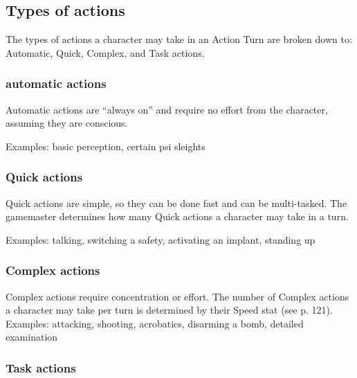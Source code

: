 \subsection{Types of actions} \label{sec:types-actions} 

The types of actions a character may take in an Action Turn are broken down to: Automatic, Quick, Complex, and Task actions. 

\subsubsection{automatic actions} \label{sec:automatic-actions} 

Automatic actions are “always on” and require no effort from the character, assuming they are conscious. 

Examples: basic perception, certain psi sleights 

\subsubsection{Quick actions} \label{sec:quick-actions} 

Quick actions are simple, so they can be done fast and can be multi-tasked. The gamemaster determines how many Quick actions a character may take in a turn. 

Examples: talking, switching a safety, activating an implant, standing up 

\subsubsection{Complex actions} \label{sec:complex-actions} 

Complex actions require concentration or effort. The number of Complex actions a character may take per turn is determined by their Speed stat (see p. 121). Examples: attacking, shooting, acrobatics, disarming a bomb, detailed examination 

\subsubsection{Task actions} \label{sec:task-actions} 

